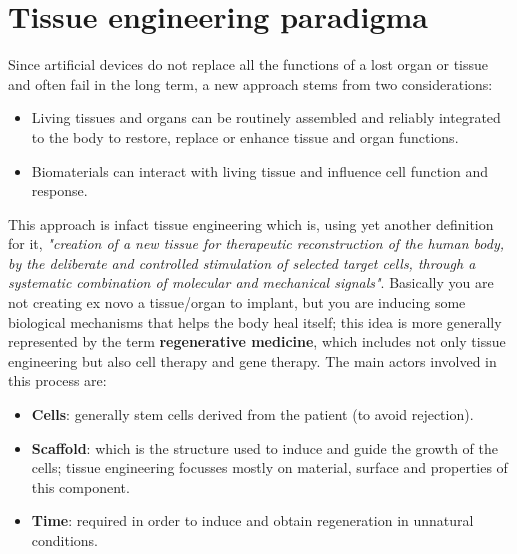 \section{Tissue engineering paradigma}
  Since artificial devices do not replace all the functions of a lost organ or tissue and often fail in the long term, a new approach stems from two considerations:
  \begin{itemize}
    \item Living tissues and organs can be routinely assembled and reliably integrated to the body to restore, replace or enhance tissue and organ functions.
    \item Biomaterials can interact with living tissue and influence cell function and response.
  \end{itemize}

  This approach is infact tissue engineering which is, using yet another definition for it, \textit{"creation of a new tissue for therapeutic reconstruction of the human body, by the deliberate and controlled stimulation of selected target cells, through a systematic combination of molecular and mechanical signals"}. Basically you are not creating ex novo a tissue/organ to implant, but you are inducing some biological mechanisms that helps the body heal itself; this idea is more generally represented by the term \textbf{regenerative medicine}, which includes not only tissue engineering but also cell therapy and gene therapy.
  The main actors involved in this process are:
  \begin{itemize}
    \item \textbf{Cells}: generally stem cells derived from the patient (to avoid rejection).
    \item \textbf{Scaffold}: which is the structure used to induce and guide the growth of the cells; tissue engineering focusses mostly on material, surface and properties of this component.
    \item \textbf{Time}: required in order to induce and obtain regeneration in unnatural conditions.
  \end{itemize}

